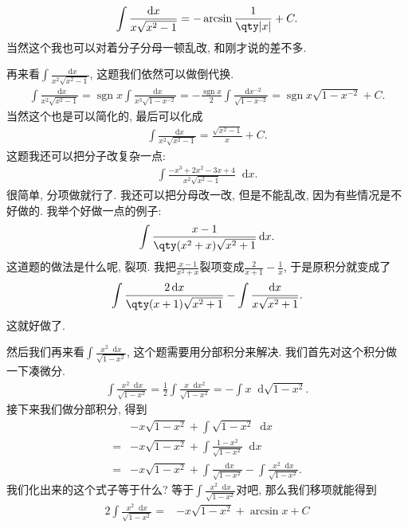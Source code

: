 \documentclass{ctexbook}
\DeclareMathOperator{\sgn}{sgn}
\newcommand*{\dif}{\mathop{}\!\mathrm{d}}
\begin{document}
{\begin{align*}
\int\frac{\dif{x}}{x\sqrt{x^{2}-1}}=-\arcsin{\frac{1}{\qty|x|}}+C
.\end{align*}
当然这个我也可以对着分子分母一顿乱改, 和刚才说的差不多. \par
再来看$\int\frac{\dif{x}}{x^{2}\sqrt{x^{2}-1}}$, 这题我们依然可以做倒代换. 
\begin{align*}
\int\frac{\dif{x}}{x^{2}\sqrt{x^{2}-1}}=\sgn{x}\int\frac{\dif{x}}{x^{3}\sqrt{1-x^{-2}}}=-\frac{\sgn{x}}{2}\int\frac{\dif{x^{-2}}}{\sqrt{1-x^{-2}}}=\sgn{x}\sqrt{1-x^{-2}}+C
.\end{align*}
当然这个也是可以简化的, 最后可以化成
\begin{align*}
\int\frac{\dif{x}}{x^{2}\sqrt{x^{2}-1}}=\frac{\sqrt{x^{2}-1}}{x}+C
.\end{align*}
这题我还可以把分子改复杂一点: 
\begin{align*}
\int\frac{-x^{3}+2x^{2}-3x+4}{x^{2}\sqrt{x^{2}-1}}\dif{x}
.\end{align*}
很简单, 分项做就行了. 我还可以把分母改一改, 但是不能乱改, 因为有些情况是不好做的. 我举个好做一点的例子: 
\begin{align*}
\int\frac{x-1}{\qty(x^{2}+x)\sqrt{x^{2}+1}}\dif{x}
.\end{align*}
这道题的做法是什么呢, 裂项. 我把$\frac{x-1}{x^{2}+x}$裂项变成$\frac{2}{x+1}-\frac{1}{x}$, 于是原积分就变成了
\begin{align*}
\int\frac{2\dif{x}}{\qty(x+1)\sqrt{x^{2}+1}}-\int\frac{\dif{x}}{x\sqrt{x^{2}+1}}
.\end{align*}
这就好做了. \par
然后我们再来看$\int\frac{x^{2}\dif{x}}{\sqrt{1-x^{2}}}$, 这个题需要用分部积分来解决. 我们首先对这个积分做一下凑微分. 
\begin{align*}
\int\frac{x^{2}\dif{x}}{\sqrt{1-x^{2}}}=\frac{1}{2}\int\frac{x\dif{x^{2}}}{\sqrt{1-x^{2}}}=-\int x\dif{\sqrt{1-x^{2}}}
.\end{align*}
接下来我们做分部积分, 得到
\begin{align*}
{}&-x\sqrt{1-x^{2}}+\int\sqrt{1-x^{2}}\dif{x}\\
={}&-x\sqrt{1-x^{2}}+\int\frac{1-x^{2}}{\sqrt{1-x^{2}}}\dif{x}\\
={}&-x\sqrt{1-x^{2}}+\int\frac{\dif{x}}{\sqrt{1-x^{2}}}-\int\frac{x^{2}\dif{x}}{\sqrt{1-x^{2}}}
.\end{align*}
我们化出来的这个式子等于什么? 等于$\int\frac{x^{2}\dif{x}}{\sqrt{1-x^{2}}}$对吧, 那么我们移项就能得到
\begin{align*}
2\int\frac{x^{2}\dif{x}}{\sqrt{1-x^{2}}}={}&-x\sqrt{1-x^{2}}+\arcsin{x}+C\\

\end{align*}}
\end{document}
